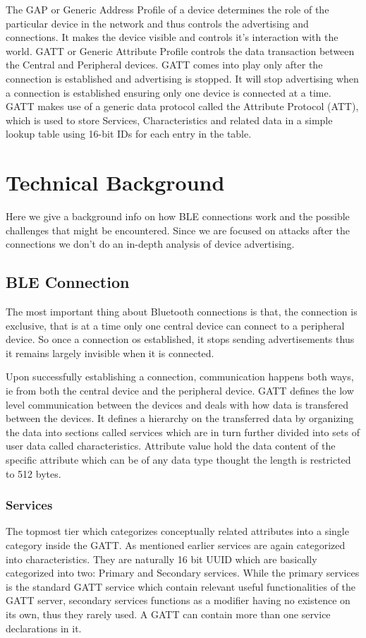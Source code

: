 \documentclass[conference]{IEEEtran}
\begin{document}
The GAP or Generic Address Profile of a device determines the role of the particular device in the network and thus controls the advertising and connections. It makes the device visible and controls it's interaction with the world. GATT or Generic Attribute Profile controls the data transaction between the Central and Peripheral devices. GATT comes into play only after the connection is established and advertising is stopped. It will stop advertising when a connection is established ensuring only one device is connected at a time. GATT makes use of a generic data protocol called the Attribute Protocol (ATT), which is used to store Services, Characteristics and related data in a simple lookup table using 16-bit IDs for each entry in the table.
\section{Technical Background}
Here we give a background info on how BLE connections work and the possible challenges that might be encountered. Since we are focused on attacks after the connections we don't do an in-depth analysis of device advertising.
\subsection{BLE Connection}
The most important thing about Bluetooth connections is that, the connection is exclusive, that is at a time only one central device can connect to a peripheral device. So once a connection os established, it stops sending advertisements thus it remains largely invisible when it is connected. 

Upon successfully establishing a connection, communication happens both ways, ie from both the central device and the peripheral device. GATT defines the low level communication between the devices and deals with how data is transfered between the devices. It defines a hierarchy on the transferred data by organizing the data into sections called services which are in turn further divided into sets of user data called characteristics. Attribute value hold the data content of the specific attribute which can be of any data type thought the length is restricted to 512 bytes.

\subsubsection{Services}
The topmost tier which categorizes conceptually related attributes into a single category inside the GATT. As mentioned earlier services are again categorized into characteristics. They are naturally 16 bit UUID which are basically categorized into two: Primary and Secondary services. While the primary services is the standard GATT service which contain relevant useful functionalities of the GATT server, secondary services functions as a modifier having no existence on its own, thus they rarely used. A GATT can contain more than one service declarations in it.
\end{document}
